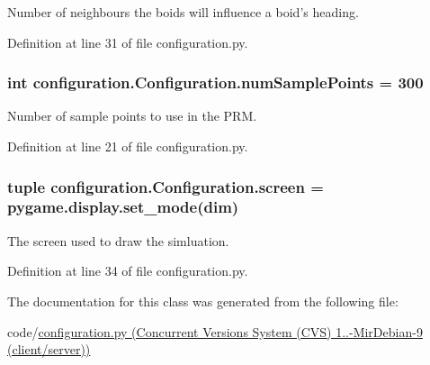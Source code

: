 Number of neighbours the boids will influence a boid's heading. 



Definition at line 31 of file configuration.\-py.

\hypertarget{classconfiguration_1_1Configuration_a35685f1f81ce810f4a429654c6b27334}{
\subsubsection[{num\-Sample\-Points}]{\setlength{\rightskip}{0pt plus 5cm}int configuration.\-Configuration.\-num\-Sample\-Points = 300\hspace{0.3cm}{\ttfamily [static]}}}\label{classconfiguration_1_1Configuration_a35685f1f81ce810f4a429654c6b27334}


Number of sample points to use in the P\-R\-M. 



Definition at line 21 of file configuration.\-py.

\hypertarget{classconfiguration_1_1Configuration_a04b8c98906296ee65625d1472e037a75}{
\subsubsection[{screen}]{\setlength{\rightskip}{0pt plus 5cm}tuple configuration.\-Configuration.\-screen = pygame.\-display.\-set\-\_\-mode({\bf dim})\hspace{0.3cm}{\ttfamily [static]}}}\label{classconfiguration_1_1Configuration_a04b8c98906296ee65625d1472e037a75}


The screen used to draw the simluation. 



Definition at line 34 of file configuration.\-py.



The documentation for this class was generated from the following file\-:\begin{DoxyCompactItemize}
\item 
code/\hyperlink{configuration_8py}{configuration.\-py (\-Concurrent Versions System (\-C\-V\-S) 1..-\/\-Mir\-Debian-\/9 (client/server))}\end{DoxyCompactItemize}
